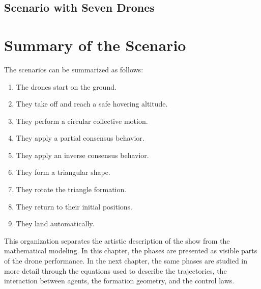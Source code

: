 \subsection{Scenario with Seven Drones}



\section{Summary of the Scenario}

The scenarios can be summarized as follows:

\begin{enumerate}
    \item The drones start on the ground.
    \item They take off and reach a safe hovering altitude.
    \item They perform a circular collective motion.
    \item They apply a partial consensus behavior.
    \item They apply an inverse consensus behavior.
    \item They form a triangular shape.
    \item They rotate the triangle formation.
    \item They return to their initial positions.
    \item They land automatically.
\end{enumerate}

This organization separates the artistic description of the show from the mathematical modeling. In this chapter, the phases are presented as visible parts of the drone performance. In the next chapter, the same phases are studied in more detail through the equations used to describe the trajectories, the interaction between agents, the formation geometry, and the control laws.